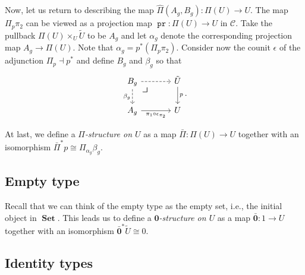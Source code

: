 \documentclass[10pt,letterpaper,cm]{nupset}
\theoremstyle{definition}
\theoremstyle{theorem}
\theoremstyle{remark}
\newcommand{\0}{\mathbf{0}}
\newcommand{\1}{\mathbf{1}}
\newcommand{\2}{\mathbf{2}}
\DeclareMathOperator{\pr}{\mathtt{pr}}
\DeclareMathOperator{\set}{\mathbf{Set}}
\renewcommand{\c}{\mathscr{C}}
\begin{document}
Now, let us return to describing the map $\hat{\Pi}(A_g, B_g) : \Pi(U) \to U$. The map $\Pi_p{\pi_2}$ can be viewed as a projection map $\pr: \Pi(U) \to U$ in $\c$. Take the pullback $\Pi(U) \times_U \tilde{U}$ to be $A_g$ and let $\alpha_g$ denote the corresponding projection map $A_g \to \Pi(U)$. Note that $\alpha_g = p^{\ast}\left(\Pi_p{\pi_2}\right)$. Consider now the counit $\epsilon$ of the adjunction $\Pi_p \dashv p^{\ast}$ and define $B_g$ and $\beta_g$ so that
\[
\begin{tikzcd}[column sep=large]
B_g \arrow[r, dashed] \arrow[d, "\beta_g"', dashed]  \arrow[dr, phantom, "\scalebox{1.5}{\color{black}$\lrcorner$}", very near start] & \tilde{U} \arrow[d, "p"] \\
A_g \arrow[r, "\pi_1 \circ \epsilon_{\pi_2}"']          & U                       
\end{tikzcd}
.\]


\smallskip

At last, we define a \textit{$\Pi$-structure on $U$} as a map $\bar{\Pi} : \Pi(U) \to U $ together with an isomorphism $\bar{\Pi}^{\ast}{p}\cong \Pi_{\alpha_g}\beta_g$.\label{depprods}

\subsection*{Empty type}

Recall that we can think of the empty type as the empty set, i.e., the initial object in $\set$. This leads us to define a \textit{$\0$-structure on $U$} as a map $\bar{\0}: 1 \to U$ together with an isomorphism $\bar{\0}^{\ast}{\tilde{U}} \cong 0$.

\subsection*{Identity types}
\end{document}
